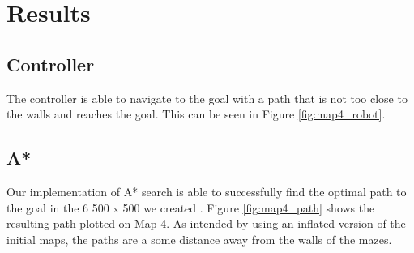 \documentclass[11pt]{article}
\begin{document}
\section{Results}



    \subsection{Controller}
    The controller is able to navigate to the goal with a path that is not too
    close to the walls and reaches the goal. This can be seen in Figure
    \ref{fig:map4_robot}.

    \subsection{A*}
    Our implementation of A* search is able to successfully find the optimal
    path to the goal in the 6 500 x 500 we created . Figure \ref{fig:map4_path}
    shows the resulting path plotted on Map 4. As intended by
    using an
    inflated version of the initial maps, the paths are a some distance away
    from the walls of the mazes.
\end{document}

